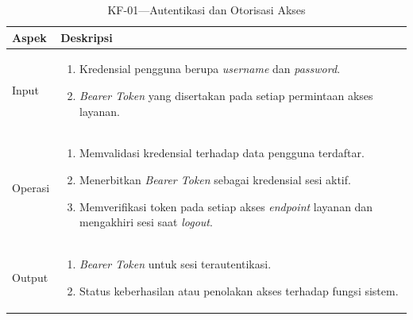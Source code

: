 \begin{xltabular}{\textwidth}{ | l | X | }
  \caption{KF-01---Autentikasi dan Otorisasi Akses} \label{tab:kf01} \\
  \hline
  \textbf{Aspek} & \textbf{Deskripsi} \\
  \hline
  \endfirsthead
  \hline
  \endfoot
  Input &
  \begin{enumerate}[leftmargin=*,nosep]
    \item Kredensial pengguna berupa \textit{username} dan \textit{password}.
    \item \textit{Bearer Token} yang disertakan pada setiap permintaan akses layanan.
  \end{enumerate} \\
  \hline
  Operasi &
  \begin{enumerate}[leftmargin=*,nosep]
    \item Memvalidasi kredensial terhadap data pengguna terdaftar.
    \item Menerbitkan \textit{Bearer Token} sebagai kredensial sesi aktif.
    \item Memverifikasi token pada setiap akses \textit{endpoint} layanan dan mengakhiri sesi saat \textit{logout}.
  \end{enumerate} \\
  \hline
  Output &
  \begin{enumerate}[leftmargin=*,nosep]
    \item \textit{Bearer Token} untuk sesi terautentikasi.
    \item Status keberhasilan atau penolakan akses terhadap fungsi sistem.
  \end{enumerate} \\
  \hline
\end{xltabular}

